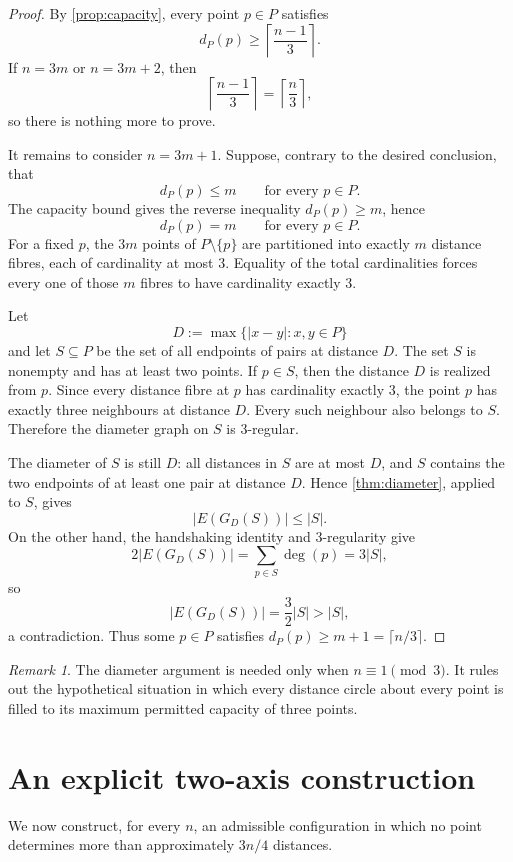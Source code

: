\documentclass[11pt]{article}
\theoremstyle{definition}
\theoremstyle{remark}
\newtheorem{remark}[remark]{Remark}
\begin{document}
\begin{proof}
By \cref{prop:capacity}, every point $p\in P$ satisfies
\[
 d_P(p)\ge\left\lceil\frac{n-1}{3}\right\rceil.
\]
If $n=3m$ or $n=3m+2$, then
\[
 \left\lceil\frac{n-1}{3}\right\rceil
 =\left\lceil\frac n3\right\rceil,
\]
so there is nothing more to prove.

It remains to consider $n=3m+1$.  Suppose, contrary to the desired conclusion, that
\[
 d_P(p)\le m
 \qquad\text{for every }p\in P.
\]
The capacity bound gives the reverse inequality $d_P(p)\ge m$, hence
\[
 d_P(p)=m
 \qquad\text{for every }p\in P.
\]
For a fixed $p$, the $3m$ points of $P\setminus\{p\}$ are partitioned into exactly $m$ distance fibres, each of cardinality at most $3$.  Equality of the total cardinalities forces every one of those $m$ fibres to have cardinality exactly $3$.

Let
\[
 D:=\max\{|x-y|:x,y\in P\}
\]
and let $S\subseteq P$ be the set of all endpoints of pairs at distance $D$.  The set $S$ is nonempty and has at least two points.  If $p\in S$, then the distance $D$ is realized from $p$.  Since every distance fibre at $p$ has cardinality exactly $3$, the point $p$ has exactly three neighbours at distance $D$.  Every such neighbour also belongs to $S$.  Therefore the diameter graph on $S$ is $3$-regular.

The diameter of $S$ is still $D$: all distances in $S$ are at most $D$, and $S$ contains the two endpoints of at least one pair at distance $D$.  Hence \cref{thm:diameter}, applied to $S$, gives
\[
 |E(G_D(S))|\le|S|.
\]
On the other hand, the handshaking identity and $3$-regularity give
\[
 2|E(G_D(S))|=\sum_{p\in S}\deg(p)=3|S|,
\]
so
\[
 |E(G_D(S))|=\frac32|S|>|S|,
\]
a contradiction.  Thus some $p\in P$ satisfies $d_P(p)\ge m+1=\lceil n/3\rceil$.
\end{proof}

\begin{remark}
The diameter argument is needed only when $n\equiv1\pmod3$.  It rules out the hypothetical situation in which every distance circle about every point is filled to its maximum permitted capacity of three points.
\end{remark}

\section{An explicit two-axis construction}\label{sec:upper}

We now construct, for every $n$, an admissible configuration in which no point determines more than approximately $3n/4$ distances.
\end{document}
